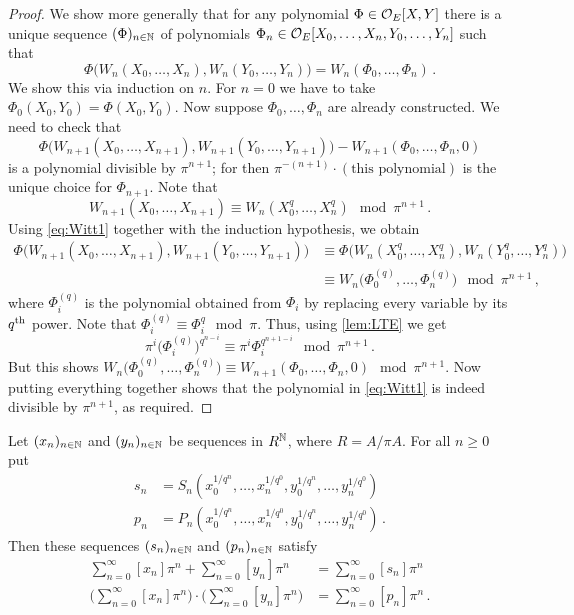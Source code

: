 \begin{proof}%
	We show more generally that for any polynomial $\Phi\in\mathcal{O}_E[X,Y]$ there is a unique sequence $(\Phi)_{n\in\mathbb{N}}$ of polynomials $\Phi_n\in\mathcal{O}_E[X_0,\dotsc,X_n,Y_0,\dotsc,Y_n]$ such that
	\begin{equation*}
		\Phi\big(W_n(X_0,\dotsc,X_n),W_n(Y_0,\dotsc,Y_n)\big)=W_n(\Phi_0,\dotsc,\Phi_n)\,.
	\end{equation*}
	We show this via induction on $n$. For $n=0$ we have to take $\Phi_0(X_0,Y_0)=\Phi(X_0,Y_0)$. Now suppose $\Phi_0,\dotsc,\Phi_n$ are already constructed. We need to check that
	\begin{equation}\label{eq:Witt1}
		\Phi\big(W_{n+1}(X_0,\dotsc,X_{n+1}),W_{n+1}(Y_0,\dotsc,Y_{n+1})\big)-W_{n+1}(\Phi_0,\dotsc,\Phi_n,0)
	\end{equation}
	is a polynomial divisible by $\pi^{n+1}$; for then $\pi^{-(n+1)}\cdot(\text{this polynomial})$ is the unique choice for $\Phi_{n+1}$. Note that 
	\begin{equation}\label{eq:Witt2}
		W_{n+1}(X_0,\dotsc,X_{n+1})\equiv W_n\left(X_0^q,\dotsc,X_n^q\right)\mod\pi^{n+1}\,.
	\end{equation}
	Using \cref{eq:Witt1} together with the induction hypothesis, we obtain
	\begin{align*}
		\Phi\big(W_{n+1}(X_0,\dotsc,X_{n+1}),W_{n+1}(Y_0,\dotsc,Y_{n+1})\big)&\equiv \Phi\big(W_n(X_0^q,\dotsc,X_n^q),W_n(Y_0^q,\dotsc,Y_n^q)\big)\\
		&\equiv W_n\big(\Phi_0^{(q)},\dotsc,\Phi_n^{(q)}\big)\mod \pi^{n+1}\,,
	\end{align*}
	where $\Phi_i^{(q)}$ is the polynomial obtained from $\Phi_i$ by replacing every variable by its $q^{\text{th}}$ power. Note that $\Phi_i^{(q)}\equiv \Phi_i^q\mod \pi$. Thus, using \cref{lem:LTE} we get
	\begin{equation*}
		\pi^i\big(\Phi_i^{(q)}\big)^{q^{n-i}}\equiv \pi^i\Phi_i^{q^{n+1-i}}\mod \pi^{n+1}\,.
	\end{equation*}
	But this shows $W_n\big(\Phi_0^{(q)},\dotsc,\Phi_n^{(q)}\big)\equiv W_{n+1}(\Phi_0,\dotsc,\Phi_n,0)\mod \pi^{n+1}$. Now putting everything together shows that the polynomial in \cref{eq:Witt1} is indeed divisible by $\pi^{n+1}$, as required.
\end{proof}
\begin{cor}\label{cor:snpn}
	Let $(x_n)_{n\in\mathbb{N}}$ and $(y_n)_{n\in\mathbb{N}}$ be sequences in $R^{\mathbb{N}}$, where $R=A/\pi A$. For all $n\geq 0$ put
	\begin{align*}
		s_n&=S_n\left(x_0^{1/q^n},\dotsc,x_n^{1/q^0},y_0^{1/q^n},\dotsc,y_n^{1/q^0}\right)\\
		p_n&=P_n\left(x_0^{1/q^n},\dotsc,x_n^{1/q^0},y_0^{1/q^n},\dotsc,y_n^{1/q^0}\right)\,. 
	\end{align*}
	Then these sequences $(s_n)_{n\in\mathbb{N}}$ and $(p_n)_{n\in\mathbb{N}}$ satisfy
	\begin{align*}
		\sum_{n=0}^\infty[x_n]\pi^n+\sum_{n=0}^\infty[y_n]\pi^n&=\sum_{n=0}^\infty[s_n]\pi^n\\
		\Bigg(\sum_{n=0}^\infty[x_n]\pi^n\Bigg)\cdot\Bigg(\sum_{n=0}^\infty[y_n]\pi^n\Bigg)&=\sum_{n=0}^\infty[p_n]\pi^n\,.
	\end{align*}
\end{cor}
